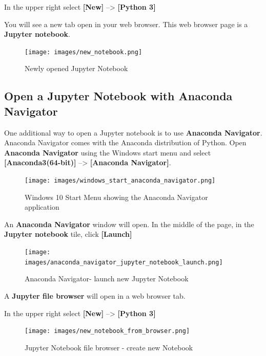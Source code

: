 \documentclass{book}
\begin{document}
In the upper right select \textbf{{[}New{]}} --\textgreater{}
\textbf{{[}Python 3{]}}

You will see a new tab open in your web browser. This web browser page
is a \textbf{Jupyter notebook}.

\begin{figure}
\centering
\texttt{[image: images/new\_notebook.png]}
\caption{Newly opened Jupyter Notebook}
\end{figure}
    




    
        \subsection{Open a Jupyter Notebook with Anaconda
Navigator}\label{open-a-jupyter-notebook-with-anaconda-navigator}
    




    
        One additional way to open a Jupyter notebook is to use \textbf{Anaconda
Navigator}. Anaconda Navigator comes with the Anaconda distribution of
Python. Open \textbf{Anaconda Navigator} using the Windows start menu
and select \textbf{{[}Anaconda3(64-bit){]}} --\textgreater{}
\textbf{{[}Anaconda Navigator{]}}.

\begin{figure}
\centering
\texttt{[image: images/windows\_start\_anaconda\_navigator.png]}
\caption{Windows 10 Start Menu showing the Anaconda Navigator
application}
\end{figure}

An \textbf{Anaconda Navigator} window will open. In the middle of the
page, in the \textbf{Jupyter notebook} tile, click \textbf{{[}Launch{]}}

\begin{figure}
\centering
\texttt{[image: images/anaconda\_navigator\_jupyter\_notebook\_launch.png]}
\caption{Anaconda Navigator- launch new Jupyter Notebook}
\end{figure}

A \textbf{Jupyter file browser} will open in a web browser tab.

In the upper right select \textbf{{[}New{]}} --\textgreater{}
\textbf{{[}Python 3{]}}

\begin{figure}
\centering
\texttt{[image: images/new\_notebook\_from\_browser.png]}
\caption{Jupyter Notebook file browser - create new Notebook}
\end{figure}
\end{document}
